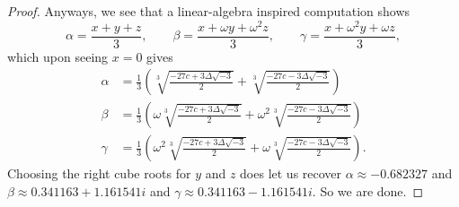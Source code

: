 \documentclass[../notes.tex]{subfiles}
\begin{document}
\begin{proof}
	Anyways, we see that a linear-algebra inspired computation shows
	\[\alpha=\frac{x+y+z}3,\qquad\beta=\frac{x+\omega y+\omega^2z}{3},\qquad\gamma=\frac{x+\omega^2y+\omega z}{3},\]
	which upon seeing $x=0$ gives
	\begin{align*}
		\alpha &= \frac13\left(\sqrt[3]{\frac{-27c+3\Delta\sqrt{-3}}2}+\sqrt[3]{\frac{-27c-3\Delta\sqrt{-3}}2}\right) \\
		\beta &= \frac13\left(\omega\sqrt[3]{\frac{-27c+3\Delta\sqrt{-3}}2}+\omega^2\sqrt[3]{\frac{-27c-3\Delta\sqrt{-3}}2}\right) \\
		\gamma &= \frac13\left(\omega^2\sqrt[3]{\frac{-27c+3\Delta\sqrt{-3}}2}+\omega\sqrt[3]{\frac{-27c-3\Delta\sqrt{-3}}2}\right).
	\end{align*}
	Choosing the right cube roots for $y$ and $z$ does let us recover $\alpha\approx-0.682327$ and $\beta\approx0.341163+1.161541i$ and $\gamma\approx0.341163-1.161541i.$ So we are done.
\end{proof}
\end{document}
